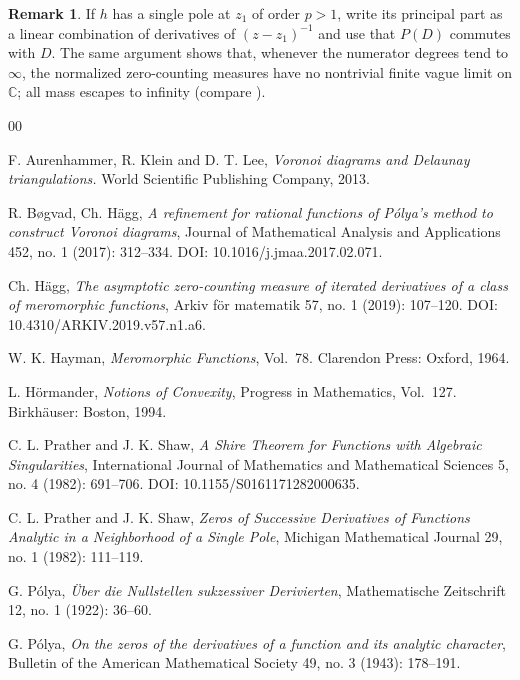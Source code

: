 \documentclass[12pt]{article}
\theoremstyle{plain}
\theoremstyle{definition}
\newtheorem{remark}[theorem]{Remark}
\begin{document}
\begin{remark}
If $h$ has a single pole at $z_1$ of order $p>1$, write its principal part as a linear combination of derivatives of $(z-z_1)^{-1}$ and use that $P(D)$ commutes with $D$.
The same argument shows that, whenever the numerator degrees tend to $\infty$, the normalized zero-counting measures have no nontrivial finite vague limit on $\mathbb C$; all mass escapes to infinity (compare \cite{PJS1}).
\end{remark}

\begin{thebibliography}{00}

 F. Aurenhammer, R. Klein and D. T. Lee,
\textit{Voronoi diagrams and Delaunay triangulations.} World Scientific Publishing Company, 2013.

 R. B\o gvad, Ch. H\"agg,
\textit{A refinement for rational functions of P\'olya's method to construct Voronoi diagrams},
Journal of Mathematical Analysis and Applications 452, no. 1 (2017): 312--334. DOI: 10.1016/j.jmaa.2017.02.071.

 Ch. H\"agg,
 \textit{The asymptotic zero-counting measure of iterated derivatives of a class of meromorphic functions}, Arkiv f\"or matematik 57, no. 1 (2019): 107--120. DOI: 10.4310/ARKIV.2019.v57.n1.a6.

 W. K. Hayman, 
\textit{Meromorphic Functions}, Vol.~78. Clarendon Press: Oxford, 1964.

 L. H\"ormander,
\textit{Notions of Convexity}, Progress in Mathematics, Vol.~127. Birkh\"auser: Boston, 1994.

 C. L. Prather and J. K. Shaw,
\textit{A Shire Theorem for Functions with Algebraic Singularities}, 
International Journal of Mathematics and Mathematical Sciences 5, no. 4 (1982): 691--706. DOI: 10.1155/S0161171282000635.

 C. L. Prather and J. K. Shaw,
\textit{Zeros of Successive Derivatives of Functions Analytic in a Neighborhood of a Single Pole},
 Michigan Mathematical Journal 29, no. 1 (1982): 111--119.

 G. P\'olya,
\textit{\"Uber die Nullstellen sukzessiver Derivierten}, Mathematische Zeitschrift 12, no. 1 (1922): 36--60.

 G. P\'olya,
\textit{On the zeros of the derivatives of a function and its analytic character},
  Bulletin of the American Mathematical Society 49, no. 3 (1943): 178--191.


\end{thebibliography}
\end{document}
